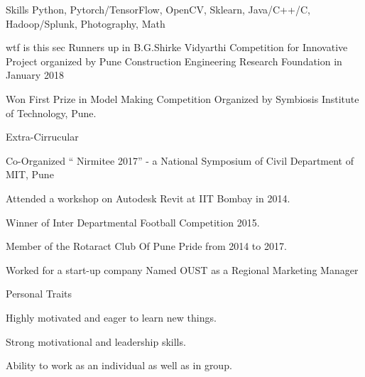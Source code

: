 \documentclass{resume} %
\begin{document}
\begin{rSection}{Skills}
	{Python, Pytorch/TensorFlow, OpenCV, Sklearn, Java/C++/C, Hadoop/Splunk, Photography, Math}
\end{rSection}








\begin{rSection}{wtf is this sec} 
 Runners up in B.G.Shirke Vidyarthi Competition for Innovative Project organized by Pune Construction Engineering Research Foundation in January 2018
\item Won First Prize in Model Making Competition Organized by Symbiosis Institute of Technology, Pune.
\end{rSection}

\newpage

\begin{rSection}{Extra-Cirrucular} \itemsep -3pt
\item Co-Organized “ Nirmitee 2017” - a National Symposium of Civil Department of MIT, Pune
\item Attended a workshop on Autodesk Revit at IIT Bombay in 2014.
\item Winner of Inter Departmental Football Competition 2015.
\item Member of the  Rotaract Club Of Pune Pride from 2014 to 2017.
\item Worked for a start-up company Named OUST as a Regional Marketing Manager

\end{rSection}

\begin{rSection}{Personal Traits}
\item Highly motivated and eager to learn new things.
\item Strong motivational and leadership skills.
\item Ability to work as an individual as well as in group.
\end{rSection}
\end{document}
